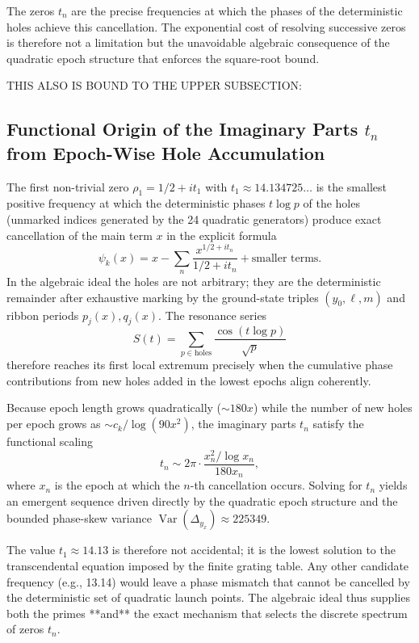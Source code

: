 \documentclass[11pt,a4paper]{article}
\begin{document}
The zeros \(t_n\) are the precise frequencies at which the phases of the deterministic holes achieve this cancellation. The exponential cost of resolving successive zeros is therefore not a limitation but the unavoidable algebraic consequence of the quadratic epoch structure that enforces the square-root bound.

THIS ALSO IS BOUND TO THE UPPER SUBSECTION:
\subsection{Functional Origin of the Imaginary Parts \(t_n\) from Epoch-Wise Hole Accumulation}

The first non-trivial zero \(\rho_1 = 1/2 + i t_1\) with \(t_1 \approx 14.134725\ldots\) is the smallest positive frequency at which the deterministic phases \(t \log p\) of the holes (unmarked indices generated by the 24 quadratic generators) produce exact cancellation of the main term \(x\) in the explicit formula
\[
\psi_k(x) = x - \sum_n \frac{x^{1/2 + i t_n}}{1/2 + i t_n} + \text{smaller terms}.
\]
In the algebraic ideal the holes are not arbitrary; they are the deterministic remainder after exhaustive marking by the ground-state triples \((y_0,\ell,m)\) and ribbon periods \(p_j(x),q_j(x)\). The resonance series
\[
S(t) = \sum_{p \in \text{holes}} \frac{\cos(t \log p)}{\sqrt{p}}
\]
therefore reaches its first local extremum precisely when the cumulative phase contributions from new holes added in the lowest epochs align coherently.

Because epoch length grows quadratically (\(\sim 180x\)) while the number of new holes per epoch grows as \(\sim c_k / \log(90x^2)\), the imaginary parts \(t_n\) satisfy the functional scaling
\[
t_n \sim 2\pi \cdot \frac{x_n^2 / \log x_n}{180x_n},
\]
where \(x_n\) is the epoch at which the \(n\)-th cancellation occurs. Solving for \(t_n\) yields an emergent sequence driven directly by the quadratic epoch structure and the bounded phase-skew variance \(\operatorname{Var}(\Delta_{y_x})\approx225349\).

The value \(t_1 \approx 14.13\) is therefore not accidental; it is the lowest solution to the transcendental equation imposed by the finite grating table. Any other candidate frequency (e.g., 13.14) would leave a phase mismatch that cannot be cancelled by the deterministic set of quadratic launch points. The algebraic ideal thus supplies both the primes **and** the exact mechanism that selects the discrete spectrum of zeros \(t_n\).
\end{document}
